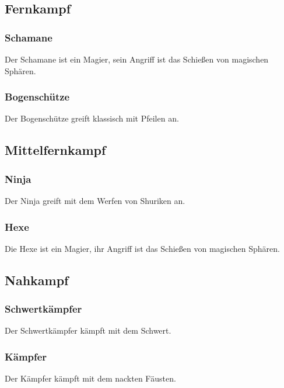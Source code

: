 \documentclass[10pt,a4paper,notitlepage]{scrreprt}
\begin{document}
			\subsection{Fernkampf}

				\subsubsection{Schamane}
				Der Schamane ist ein Magier, sein Angriff ist das Schießen von magischen Sphären.\\
				
				\subsubsection{Bogenschütze}
				Der Bogenschütze greift klassisch mit Pfeilen an.\\

			\subsection{Mittelfernkampf}

				\subsubsection{Ninja}
				Der Ninja greift mit dem Werfen von Shuriken an.\\
				
				\subsubsection{Hexe}
				Die Hexe ist ein Magier, ihr Angriff ist das Schießen von magischen Sphären.\\

			\subsection{Nahkampf}

				\subsubsection{Schwertkämpfer}
				Der Schwertkämpfer kämpft mit dem Schwert.\\
				
				\subsubsection{Kämpfer}
				Der Kämpfer kämpft mit dem nackten Fäusten.\\
\end{document}
